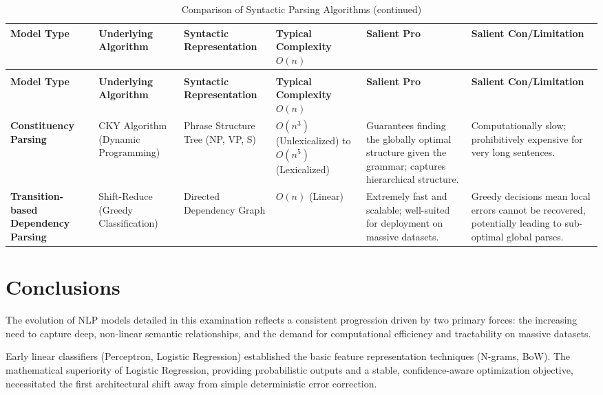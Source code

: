 \documentclass{article}
\begin{document}
\begin{longtable}{|p{2.3cm}|p{2.8cm}|p{2.2cm}|p{2.3cm}|p{3.0cm}|p{3.0cm}|}
\caption{Comparison of Syntactic Parsing Algorithms}
\label{tab:parsing_comparison} \\
\toprule
\textbf{Model Type} & \textbf{Underlying Algorithm} & \textbf{Syntactic Representation} & \textbf{Typical Complexity $O(n)$} & \textbf{Salient Pro} & \textbf{Salient Con/Limitation} \\
\midrule
\endfirsthead
\caption{Comparison of Syntactic Parsing Algorithms (continued)} \\
\toprule
\textbf{Model Type} & \textbf{Underlying Algorithm} & \textbf{Syntactic Representation} & \textbf{Typical Complexity $O(n)$} & \textbf{Salient Pro} & \textbf{Salient Con/Limitation} \\
\midrule
\endhead
\bottomrule
\endfoot
\bottomrule
\endlastfoot
\textbf{Constituency Parsing} & CKY Algorithm (Dynamic Programming) & Phrase Structure Tree (NP, VP, S)  & $O(n^3)$ (Unlexicalized) to $O(n^5)$ (Lexicalized)  & Guarantees finding the globally optimal structure given the grammar; captures hierarchical structure. & Computationally slow; prohibitively expensive for very long sentences. \\
\hline
\textbf{Transition-based Dependency Parsing} & Shift-Reduce (Greedy Classification) & Directed Dependency Graph  & $O(n)$ (Linear)  & Extremely fast and scalable; well-suited for deployment on massive datasets. & Greedy decisions mean local errors cannot be recovered, potentially leading to sub-optimal global parses. \\
\hline
\end{longtable}

\section{Conclusions}

The evolution of NLP models detailed in this examination reflects a consistent progression driven by two primary forces: the increasing need to capture deep, non-linear semantic relationships, and the demand for computational efficiency and tractability on massive datasets.

Early linear classifiers (Perceptron, Logistic Regression) established the basic feature representation techniques (N-grams, BoW). The mathematical superiority of Logistic Regression, providing probabilistic outputs and a stable, confidence-aware optimization objective, necessitated the first architectural shift away from simple deterministic error correction.
\end{document}
